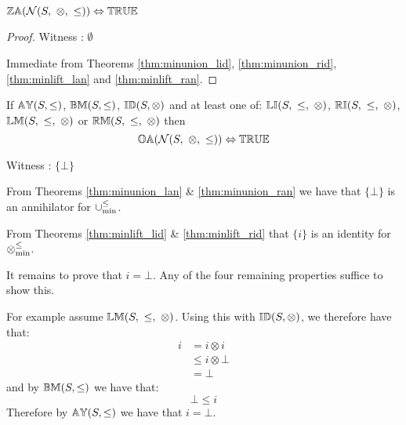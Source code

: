 \begin{theorem} \label{thm:N_zo}
${\mathbb{ZA}}(\mathcal{N}(S,\ \otimes,\ \leq)) \Leftrightarrow {\mathbb{TRUE}}$
\end{theorem}

\begin{proof}

\vspace{0.5em}
Witness : $\emptyset$

\vspace{0.5em}
Immediate from Theorems \ref{thm:minunion_lid}, \ref{thm:minunion_rid}, \ref{thm:minlift_lan} and \ref{thm:minlift_ran}.
\end{proof}


\begin{theorem} \label{thm:N_oa}
If ${\mathbb{AY}}(S,\leq)$, ${\mathbb{BM}}(S,\leq)$, ${\mathbb{ID}}(S,\otimes)$ and at least one of: $\propname{LI}(S,\ \leq,\ \otimes)$, $\propname{RI}(S,\ \leq,\ \otimes)$, $\propname{LM}(S,\ \leq,\ \otimes)$ or $\propname{RM}(S,\ \leq,\ \otimes)$ then
\begin{equation*}
{\mathbb{OA}}(\mathcal{N}(S,\ \otimes,\ \leq)) \Leftrightarrow {\mathbb{TRUE}}
\end{equation*}
\end{theorem}

\proof

\vspace{0.5em}
Witness : $\{ \bot \}$

\vspace{0.5em}

From Theorems \ref{thm:minunion_lan} \& \ref{thm:minunion_ran} we have that $\{ \bot \}$ is an annihilator for $\mathbin{\cup_{\min}^{\leq}}$.

\vspace{0.5em}

From Theorems \ref{thm:minlift_lid} \& \ref{thm:minlift_rid} that $\{ i \}$ is an identity for $\mathbin{\otimes_{\min}^{\leq}}$.

\vspace{0.5em}

It remains to prove that $i = \bot$. Any of the four remaining properties suffice to show this. 

\vspace{0.5em}

For example assume $\propname{LM}(S,\ \leq,\ \otimes)$. Using this with ${\mathbb{ID}}(S,\otimes)$, we therefore have that:
\begin{align*}
i 	& = i \otimes i \\
  	& \leq i \otimes \bot \\
  	& = \bot
\end{align*} 
and by ${\mathbb{BM}}(S,\leq)$ we have that:
\begin{equation*}
\bot \leq i
\end{equation*}
Therefore by ${\mathbb{AY}}(S,\leq)$ we have that $i = \bot$.



